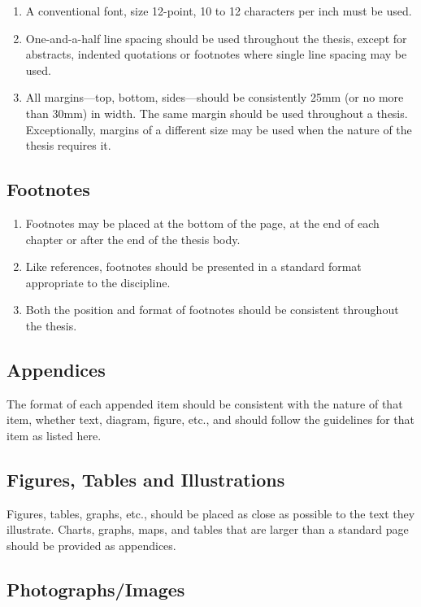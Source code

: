 \begin{enumerate}
  \item A conventional font, size 12-point, 10 to 12 characters per inch must be used.
  \item One-and-a-half line spacing should be used throughout the thesis, except for abstracts, indented quotations or footnotes where single line spacing may be used.
  \item All margins—top, bottom, sides—should be consistently 25mm (or no more than 30mm) in width. The same margin should be used throughout a thesis. Exceptionally, margins of a different size may be used when the nature of the thesis requires it.
\end{enumerate}

\subsection{Footnotes}

\begin{enumerate}
  \item Footnotes may be placed at the bottom of the page, at the end of each chapter or after the end of the thesis body.
  \item Like references, footnotes should be presented in a standard format appropriate to the discipline.
  \item Both the position and format of footnotes should be consistent throughout the thesis.
\end{enumerate}

\subsection{Appendices}

The format of each appended item should be consistent with the nature of that item, whether text, diagram, figure, etc., and should follow the guidelines for that item as listed here.

\subsection{Figures, Tables and Illustrations}

Figures, tables, graphs, etc., should be placed as close as possible to the text they illustrate. Charts, graphs, maps, and tables that are larger than a standard page should be provided as appendices.

\subsection{Photographs/Images}

